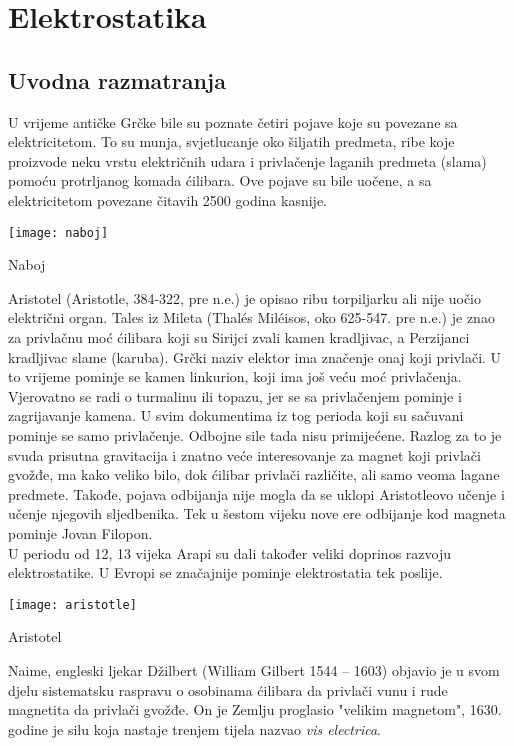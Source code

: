 	\chapter {Elektrostatika}


	\section{Uvodna razmatranja}
	U vrijeme antičke Grčke bile su poznate četiri pojave koje su povezane sa elektricitetom. To su munja, svjetlucanje oko šiljatih predmeta, ribe koje proizvode neku vrstu električnih udara i privlačenje laganih predmeta (slama) pomoću protrljanog komada ćilibara. Ove pojave su bile uočene, a sa elektricitetom povezane čitavih 2500 godina kasnije.

	\begin{marginfigure}%
		\texttt{[image: naboj]}
		\caption{Naboj}
		\label{fig:naboj}
	\end{marginfigure}
	Aristotel (Aristotle, 384-322, pre n.e.) je opisao ribu torpiljarku ali nije uočio električni organ. Tales iz Mileta (Thalés Miléisos, oko 625-547. pre n.e.) je znao za privlačnu moć ćilibara koji su Sirijci zvali kamen kradljivac, a Perzijanci kradljivac slame (karuba). Grčki naziv elektor  ima značenje onaj koji privlači. U to vrijeme pominje se kamen linkurion, koji ima još veću moć privlačenja. Vjerovatno se radi o turmalinu ili topazu, jer se sa privlačenjem pominje i zagrijavanje kamena. U svim dokumentima iz tog perioda koji su sačuvani pominje se samo privlačenje. Odbojne sile tada nisu primijećene. Razlog za to je svuda prisutna gravitacija i znatno veće interesovanje za magnet koji privlači gvožđe, ma kako veliko bilo, dok ćilibar privlači različite, ali samo veoma lagane predmete. Takođe, pojava odbijanja nije mogla da se uklopi Aristotleovo učenje i učenje njegovih sljedbenika. Tek u šestom vijeku nove ere odbijanje kod magneta pominje Jovan Filopon. \\
	U periodu od 12, 13 vijeka Arapi su dali također veliki doprinos razvoju elektrostatike. U Evropi se značajnije pominje elektrostatia tek poslije.
	\begin{marginfigure}%
		\texttt{[image: aristotle]}
		\caption{Aristotel}
		\label{fig:aristotle}
	\end{marginfigure} 
	Naime, engleski ljekar Džilbert (William Gilbert 1544 – 1603) objavio je u svom djelu sistematsku raspravu o osobinama ćilibara da privlači vunu i rude magnetita da privlači gvožđe. On je Zemlju proglasio "velikim magnetom", 1630. godine je silu koja nastaje trenjem tijela nazvao \textit{vis electrica}.
	
